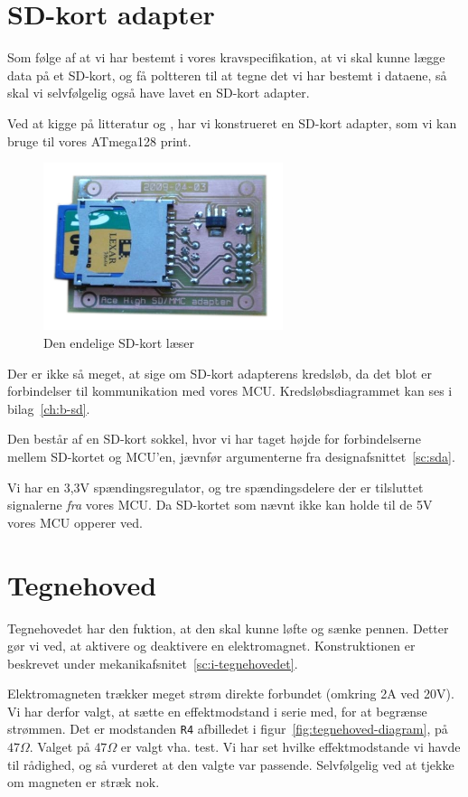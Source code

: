 \section{SD-kort adapter}
Som følge af at vi har bestemt i vores kravspecifikation, at vi skal
kunne lægge data på et SD-kort, og få poltteren til at tegne det vi
har bestemt i dataene, så skal vi selvfølgelig også have lavet en
SD-kort adapter.

Ved at kigge på litteratur \cite{web:captain-mmc} og
\cite{web:sd-pinout}, har vi konstrueret en SD-kort adapter, som vi kan bruge
til vores ATmega128 print.

\begin{figure}[htbp]
  \centering
  \includegraphics[width=7cm]{./img/sd-adapter}
  \caption{Den endelige SD-kort læser}
  \label{fig:sd-adapter}
\end{figure}

Der er ikke så meget, at sige om SD-kort adapterens kredsløb, da det
blot er forbindelser til kommunikation med vores
MCU. Kredsløbsdiagrammet kan ses i bilag~\vref{ch:b-sd}.

Den består af en SD-kort sokkel, hvor vi har taget højde for
forbindelserne mellem SD-kortet og MCU'en, jævnfør argumenterne fra
designafsnittet~\vref{sc:sda}.

Vi har en 3,3V spændingsregulator, og tre spændingsdelere der er
tilsluttet signalerne \textit{fra} vores MCU. Da SD-kortet som nævnt
ikke kan holde til de 5V vores MCU opperer ved.

\section{Tegnehoved}
Tegnehovedet har den fuktion, at den skal kunne løfte og sænke
pennen. Detter gør vi ved, at aktivere og deaktivere en
elektromagnet. Konstruktionen er beskrevet under
mekanikafsnitet~\vref{sc:i-tegnehovedet}.

Elektromagneten trækker meget strøm direkte forbundet (omkring 2A ved
20V). Vi har derfor valgt, at sætte en effektmodstand i serie med, for
at begrænse strømmen. Det er modstanden \texttt{R4} afbilledet i
figur~\vref{fig:tegnehoved-diagram}, på $47\Omega$. Valget på
$47\Omega$ er valgt vha. test. Vi har set hvilke effektmodstande vi
havde til rådighed, og så vurderet at den valgte var
passende. Selvfølgelig ved at tjekke om magneten er stræk nok.

